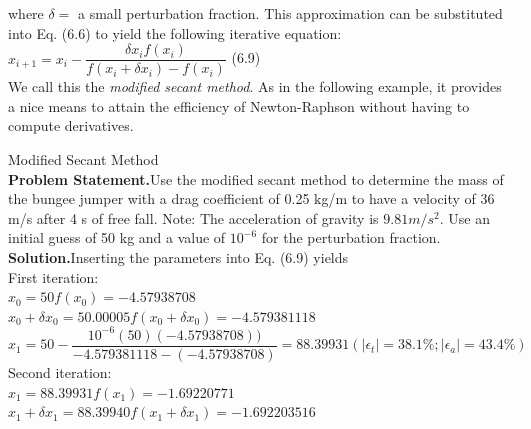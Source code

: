 \documentclass[../main.tex]{subfiles}
\begin{document}
\noindent where $\delta =$ a small perturbation fraction. This approximation can be substituted into
Eq. (6.6) to yield the following iterative equation:\\

$x_{i+1} = x_i-\dfrac{\delta x_i f(x_i)}{f(x_i + \delta x_i)-f(x_i)}$
\hfill (6.9)\\

We call this the \emph{modified secant method}. As in the following example, it provides a nice
means to attain the efficiency of Newton-Raphson without having to compute derivatives.\\

\begin{example} Modified Secant Method\\

    \noindent\textbf{Problem Statement.}\quad Use the modified secant method to determine the mass of the
    bungee jumper with a drag coefficient of 0.25 kg/m to have a velocity of 36 m/s after 4 s of
    free fall. Note: The acceleration of gravity is $9.81 m/s^2$. Use an initial guess of 50 kg and a
    value of $10^{-6}$ for the perturbation fraction.\\

    \noindent\textbf{Solution.}\quad Inserting the parameters into Eq. (6.9) yields\\

    \noindent First iteration:\\

    $x_0 = 50$\hspace{28.5mm}$f(x_0) = -4.57938708$\\

    $x_0 + \delta x_0 = 50.00005$\hspace{10mm}$f(x_0+\delta x_0) = -4.579381118$\\

    $x_1 = 50-\dfrac{10^{-6}(50)(-4.57938708))}{-4.579381118 - (-4.57938708)}=
    88.39931(\left\lvert \epsilon_t \right\rvert = 38.1\%; \left\lvert \epsilon_a \right\rvert =43.4\% )$\\

    \noindent Second iteration:\\

    $x_1 = 88.39931$\hspace{20mm}$f(x_1) = -1.69220771$\\

    $x_1 + \delta x_1 = 88.39940$\hspace{11mm}$f(x_1+ \delta x_1) = -1.692203516$\\


\end{example}
\end{document}
